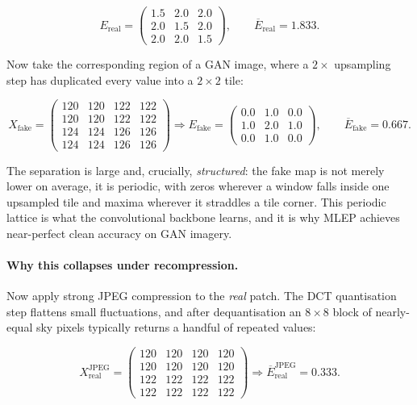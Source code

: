 \[
E_{\text{real}} =
\begin{pmatrix}
1.5 & 2.0 & 2.0\\
2.0 & 1.5 & 2.0\\
2.0 & 2.0 & 1.5
\end{pmatrix},
\qquad \overline{E}_{\text{real}} = 1.833 .
\]

Now take the corresponding region of a GAN image, where a $2\times$ upsampling
step has duplicated every value into a $2\times2$ tile:

\[
X_{\text{fake}} =
\begin{pmatrix}
120 & 120 & 122 & 122\\
120 & 120 & 122 & 122\\
124 & 124 & 126 & 126\\
124 & 124 & 126 & 126
\end{pmatrix}
\Longrightarrow
E_{\text{fake}} =
\begin{pmatrix}
0.0 & 1.0 & 0.0\\
1.0 & 2.0 & 1.0\\
0.0 & 1.0 & 0.0
\end{pmatrix},
\qquad \overline{E}_{\text{fake}} = 0.667 .
\]

The separation is large and, crucially, \emph{structured}: the fake map is not
merely lower on average, it is periodic, with zeros wherever a window falls
inside one upsampled tile and maxima wherever it straddles a tile corner. This
periodic lattice is what the convolutional backbone learns, and it is why MLEP
achieves near-perfect clean accuracy on GAN imagery.

\paragraph{Why this collapses under recompression.}
Now apply strong JPEG compression to the \emph{real} patch. The DCT
quantisation step flattens small fluctuations, and after dequantisation an
$8\times8$ block of nearly-equal sky pixels typically returns a handful of
repeated values:

\[
X_{\text{real}}^{\text{JPEG}} =
\begin{pmatrix}
120 & 120 & 120 & 120\\
120 & 120 & 120 & 120\\
122 & 122 & 122 & 122\\
122 & 122 & 122 & 122
\end{pmatrix}
\Longrightarrow
\overline{E}_{\text{real}}^{\text{JPEG}} = 0.333 .
\]

